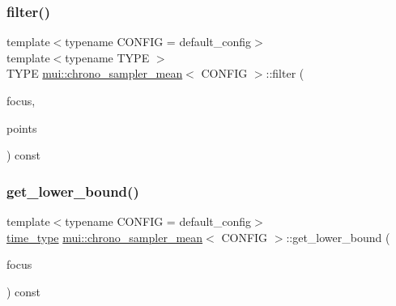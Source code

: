 \subsubsection{\texorpdfstring{filter()}{filter()}}
{\footnotesize\ttfamily template$<$typename C\+O\+N\+F\+IG  = default\+\_\+config$>$ \\
template$<$typename T\+Y\+PE $>$ \\
T\+Y\+PE \hyperlink{classmui_1_1chrono__sampler__mean}{mui\+::chrono\+\_\+sampler\+\_\+mean}$<$ C\+O\+N\+F\+IG $>$\+::filter (\begin{DoxyParamCaption}\item[{\hyperlink{classmui_1_1chrono__sampler__mean_aa818a9c8850aa9fda611430c158a0072}{time\+\_\+type}}]{focus,  }\item[{const std\+::vector$<$ std\+::pair$<$ \hyperlink{classmui_1_1chrono__sampler__mean_aa818a9c8850aa9fda611430c158a0072}{time\+\_\+type}, T\+Y\+PE $>$ $>$ \&}]{points }\end{DoxyParamCaption}) const\hspace{0.3cm}{\ttfamily [inline]}}

\mbox{\label{classmui_1_1chrono__sampler__mean_a508bd28c3cdae31a4fbc768f46194964}} 
\subsubsection{\texorpdfstring{get\+\_\+lower\+\_\+bound()}{get\_lower\_bound()}}
{\footnotesize\ttfamily template$<$typename C\+O\+N\+F\+IG  = default\+\_\+config$>$ \\
\hyperlink{classmui_1_1chrono__sampler__mean_aa818a9c8850aa9fda611430c158a0072}{time\+\_\+type} \hyperlink{classmui_1_1chrono__sampler__mean}{mui\+::chrono\+\_\+sampler\+\_\+mean}$<$ C\+O\+N\+F\+IG $>$\+::get\+\_\+lower\+\_\+bound (\begin{DoxyParamCaption}\item[{\hyperlink{classmui_1_1chrono__sampler__mean_aa818a9c8850aa9fda611430c158a0072}{time\+\_\+type}}]{focus }\end{DoxyParamCaption}) const\hspace{0.3cm}{\ttfamily [inline]}}

